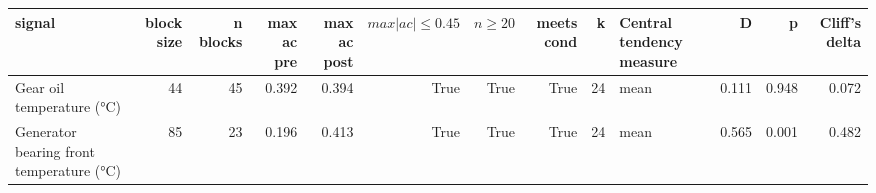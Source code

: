 \begin{tabular}{lrrrrrrrrlrrr}
\toprule
signal & block size & n blocks & max ac pre & max ac post & $max |ac| \leq 0.45$ & $n \geq 20$ & meets cond & k & Central tendency measure & D & p & Cliff's delta \\
\midrule
Gear oil temperature (°C) & 44 & 45 & 0.392 & 0.394 & True & True & True & 24 & mean & 0.111 & 0.948 & 0.072 \\
Generator bearing front temperature (°C) & 85 & 23 & 0.196 & 0.413 & True & True & True & 24 & mean & 0.565 & 0.001 & 0.482 \\
\bottomrule
\end{tabular}
